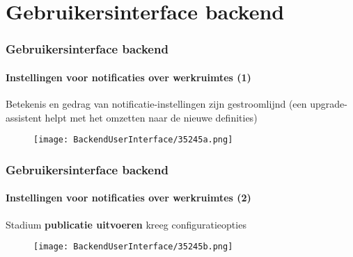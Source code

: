 %

\section{Gebruikersinterface backend}

\begin{frame}[fragile]
	\frametitle{Gebruikersinterface backend}
	\framesubtitle{Instellingen voor notificaties over werkruimtes (1)}

	Betekenis en gedrag van notificatie-instellingen zijn gestroomlijnd\newline
	\smaller(een upgrade-assistent helpt met het omzetten naar de nieuwe definities)\normalsize

	\begin{figure}
		\texttt{[image: BackendUserInterface/35245a.png]}
	\end{figure}

\end{frame}

\begin{frame}[fragile]
	\frametitle{Gebruikersinterface backend}
	\framesubtitle{Instellingen voor notificaties over werkruimtes (2)}

	Stadium \textbf{publicatie uitvoeren} kreeg configuratieopties

	\begin{figure}
		\texttt{[image: BackendUserInterface/35245b.png]}
	\end{figure}

\end{frame}

